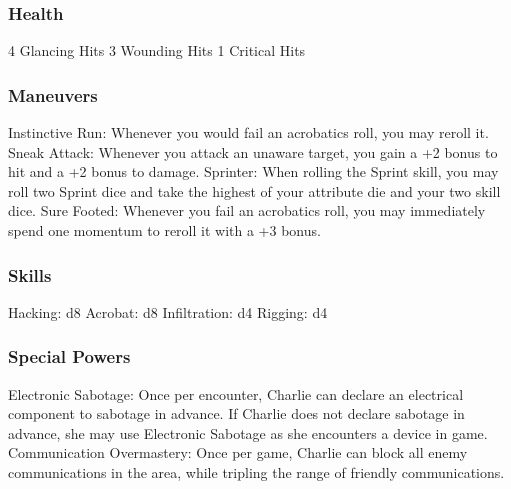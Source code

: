 \documentclass{article}
\begin{document}
\subsubsection{Health}
4 Glancing Hits
3 Wounding Hits
1 Critical Hits
\subsubsection{Maneuvers}
Instinctive Run: Whenever you would fail an acrobatics roll, you may reroll it.
Sneak Attack: Whenever you attack an unaware target, you gain a +2 bonus to hit and a +2 bonus to damage.
Sprinter: When rolling the Sprint skill, you may roll two Sprint dice and take the highest of your attribute die and your two skill dice.
Sure Footed: Whenever you fail an acrobatics roll, you may immediately spend one momentum to reroll it with a +3 bonus.
\subsubsection{Skills}
Hacking: d8
Acrobat: d8
Infiltration: d4
Rigging: d4
\subsubsection{Special Powers}
Electronic Sabotage: Once per encounter, Charlie can declare an electrical component to sabotage in advance. If Charlie does not declare sabotage in advance, she may use Electronic Sabotage as she encounters a device in game.
Communication Overmastery: Once per game, Charlie can block all enemy communications in the area, while tripling the range of friendly communications.
\end{document}
